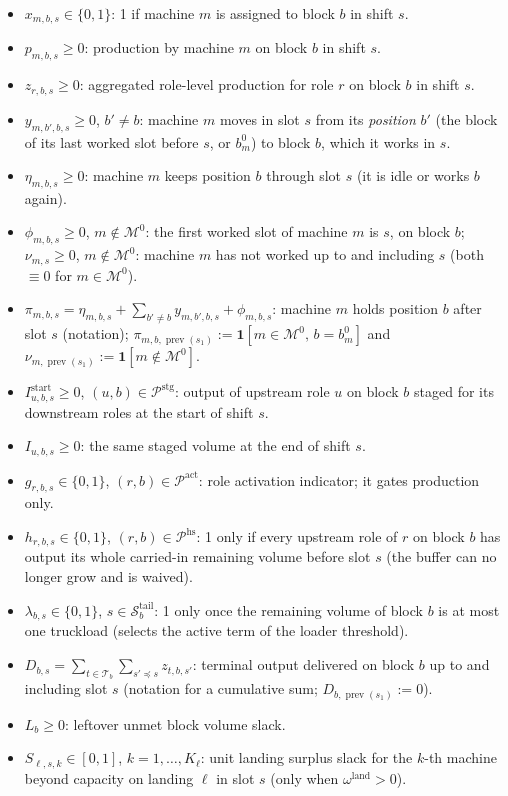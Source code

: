 \begin{itemize}
\tightlist
\item
  \(x_{m,b,s} \in \{0,1\}\): 1 if machine \(m\) is assigned to block
  \(b\) in shift \(s\).
\item
  \(p_{m,b,s} \ge 0\): production by machine \(m\) on block \(b\) in
  shift \(s\).
\item
  \(z_{r,b,s} \ge 0\): aggregated role-level production for role \(r\)
  on block \(b\) in shift \(s\).
\item
  \(y_{m,b',b,s} \ge 0\), \(b' \ne b\): machine \(m\) moves in slot
  \(s\) from its \emph{position} \(b'\) (the block of its last worked
  slot before \(s\), or \(b^{0}_m\)) to block \(b\), which it works in
  \(s\).
\item
  \(\eta_{m,b,s} \ge 0\): machine \(m\) keeps position \(b\) through
  slot \(s\) (it is idle or works \(b\) again).
\item
  \(\phi_{m,b,s} \ge 0\), \(m\notin\mathcal{M}^{0}\): the first worked
  slot of machine \(m\) is \(s\), on block \(b\); \(\nu_{m,s} \ge 0\),
  \(m\notin\mathcal{M}^{0}\): machine \(m\) has not worked up to and
  including \(s\) (both \(\equiv 0\) for \(m\in\mathcal{M}^{0}\)).
\item
  \(\pi_{m,b,s} = \eta_{m,b,s} + \sum_{b'\ne b} y_{m,b',b,s} + \phi_{m,b,s}\):
  machine \(m\) holds position \(b\) after slot \(s\) (notation);
  \(\pi_{m,b,\operatorname{prev}(s_1)} := \mathbf{1}[m\in\mathcal{M}^{0},\, b=b^{0}_m]\)
  and
  \(\nu_{m,\operatorname{prev}(s_1)} := \mathbf{1}[m\notin\mathcal{M}^{0}]\).
\item
  \(I^{\text{start}}_{u,b,s} \ge 0\),
  \((u,b)\in\mathcal{P}^{\text{stg}}\): output of upstream role \(u\) on
  block \(b\) staged for its downstream roles at the start of shift
  \(s\).
\item
  \(I_{u,b,s} \ge 0\): the same staged volume at the end of shift \(s\).
\item
  \(g_{r,b,s} \in \{0,1\}\), \((r,b)\in\mathcal{P}^{\text{act}}\): role
  activation indicator; it gates production only.
\item
  \(h_{r,b,s} \in \{0,1\}\), \((r,b)\in\mathcal{P}^{\text{hs}}\): 1 only
  if every upstream role of \(r\) on block \(b\) has output its whole
  carried-in remaining volume before slot \(s\) (the buffer can no
  longer grow and is waived).
\item
  \(\lambda_{b,s} \in \{0,1\}\), \(s\in\mathcal{S}^{\text{tail}}_b\): 1
  only once the remaining volume of block \(b\) is at most one truckload
  (selects the active term of the loader threshold).
\item
  \(D_{b,s} = \sum_{t\in\mathcal{T}_b}\sum_{s'\preceq s} z_{t,b,s'}\):
  terminal output delivered on block \(b\) up to and including slot
  \(s\) (notation for a cumulative sum;
  \(D_{b,\operatorname{prev}(s_1)} := 0\)).
\item
  \(L_b \ge 0\): leftover unmet block volume slack.
\item
  \(S_{\ell,s,k} \in [0,1]\), \(k = 1,\dots,K_{\ell}\): unit landing
  surplus slack for the \(k\)-th machine beyond capacity on landing
  \(\ell\) in slot \(s\) (only when \(\omega^{\text{land}} > 0\)).
\end{itemize}

